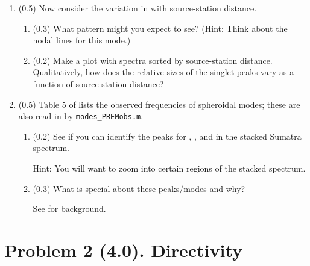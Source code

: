 \documentclass[11pt,titlepage,fleqn]{article}
\begin{document}
\begin{enumerate}

\item (0.5) Now consider the variation in  with source-station distance.
%
\begin{enumerate}
\item (0.3) What pattern might you expect to see? (Hint: Think about the nodal lines for this mode.)

\item (0.2) Make a plot with   spectra sorted by source-station distance. Qualitatively, how does the relative sizes of the singlet peaks vary as a function of source-station distance?
\end{enumerate}


\item (0.5) Table 5 of \citet{PREM} lists the observed frequencies of spheroidal modes; these are also read in by \verb+modes_PREMobs.m+.
%
\begin{enumerate}
\item (0.2) See if you can identify the peaks for , , and  in the stacked Sumatra spectrum.

Hint: You will want to zoom into certain regions of the stacked spectrum.

\item (0.3) What is special about these peaks/modes and why?

See \citet[][p. 106]{SteinWysession} for background.
\end{enumerate}

\end{enumerate}


\pagebreak
\section*{Problem 2 (4.0). Directivity}
\end{document}
